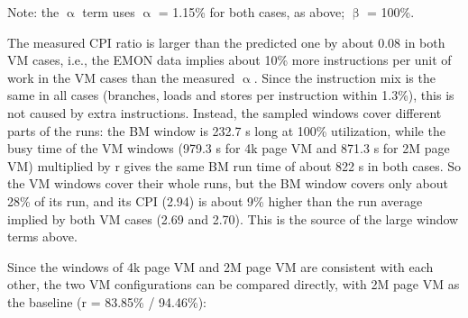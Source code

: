 \documentclass[12pt]{article}
\newcommand\tablefont{\normalfont}}}}
\newcommand{\npar}[1]{#1\par}
\newcommand{\emptypar}{\mbox{}\par}
\begin{document}
\npar{\hspace*{9.75pt}Note: the \ensuremath{\upalpha} term uses \ensuremath{\upalpha} = 1.15\% for both cases, as above; \ensuremath{\upbeta} = 100\%.}
\emptypar
\npar{\hspace*{9.75pt}The measured CPI ratio is larger than the predicted one by about 0.08 in both VM cases, i.e., the EMON data implies about 10\% more instructions per unit of work in the VM cases than the measured \ensuremath{\upalpha}. Since the instruction mix is the same in all cases (branches, loads and stores per instruction within 1.3\%), this is not caused by extra instructions. Instead, the sampled windows cover different parts of the runs: the BM window is 232.7 s long at 100\% utilization, while the busy time of the VM windows (979.3 s for 4k page VM and 871.3 s for 2M page VM) multiplied by r gives the same BM run time of about 822 s in both cases. So the VM windows cover their whole runs, but the BM window covers only about 28\% of its run, and its CPI (2.94) is about 9\% higher than the run average implied by both VM cases (2.69 and 2.70). This is the source of the large window terms above.}
\npar{\hspace*{9.75pt}Since the windows of 4k page VM and 2M page VM are consistent with each other, the two VM configurations can be compared directly, with 2M page VM as the baseline (r = 83.85\% / 94.46\%):}
\par\begingroup\tablefont\fontsize{11pt}{13.42pt}\selectfont\setlength{\tabcolsep}{5.40pt}
\end{document}
